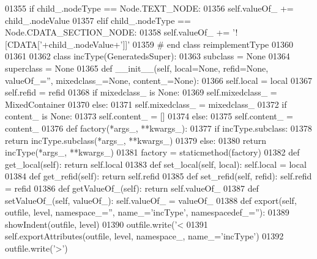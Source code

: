 \begin{DoxyCode}
{{{{{{{{{{{{{{{{{{{{{{{{{{{{{{{{{{{{{{{{{{{{{{{{{{{{{{{{{{{{{{{{{{{{{{{{{{{{{{{01355         \textcolor{keywordflow}{if} child\_.nodeType == Node.TEXT\_NODE:
01356             self.valueOf_ += child\_.nodeValue
01357         \textcolor{keywordflow}{elif} child\_.nodeType == Node.CDATA\_SECTION\_NODE:
01358             self.valueOf_ += \textcolor{stringliteral}{'![CDATA['}+child\_.nodeValue+\textcolor{stringliteral}{']]'}
01359 \textcolor{comment}{# end class reimplementType}
01360 
01361 
01362 \textcolor{keyword}{class }incType(GeneratedsSuper):
01363     subclass = \textcolor{keywordtype}{None}
01364     superclass = \textcolor{keywordtype}{None}
01365     \textcolor{keyword}{def }__init__(self, local=None, refid=None, valueOf\_='', mixedclass\_=None, content\_=None):
01366         self.local = local
01367         self.refid = refid
01368         \textcolor{keywordflow}{if} mixedclass\_ \textcolor{keywordflow}{is} \textcolor{keywordtype}{None}:
01369             self.mixedclass_ = MixedContainer
01370         \textcolor{keywordflow}{else}:
01371             self.mixedclass_ = mixedclass\_
01372         \textcolor{keywordflow}{if} content\_ \textcolor{keywordflow}{is} \textcolor{keywordtype}{None}:
01373             self.content_ = []
01374         \textcolor{keywordflow}{else}:
01375             self.content_ = content\_
01376     \textcolor{keyword}{def }factory(*args\_, **kwargs\_):
01377         \textcolor{keywordflow}{if} incType.subclass:
01378             \textcolor{keywordflow}{return} incType.subclass(*args\_, **kwargs\_)
01379         \textcolor{keywordflow}{else}:
01380             \textcolor{keywordflow}{return} incType(*args\_, **kwargs\_)
01381     factory = staticmethod(factory)
01382     \textcolor{keyword}{def }get_local(self): \textcolor{keywordflow}{return} self.local
01383     \textcolor{keyword}{def }set_local(self, local): self.local = local
01384     \textcolor{keyword}{def }get_refid(self): \textcolor{keywordflow}{return} self.refid
01385     \textcolor{keyword}{def }set_refid(self, refid): self.refid = refid
01386     \textcolor{keyword}{def }getValueOf_(self): \textcolor{keywordflow}{return} self.valueOf\_
01387     \textcolor{keyword}{def }setValueOf_(self, valueOf\_): self.valueOf\_ = valueOf\_
01388     \textcolor{keyword}{def }export(self, outfile, level, namespace\_='', name\_='incType', namespacedef\_=''):
01389         showIndent(outfile, level)
01390         outfile.write(\textcolor{stringliteral}{'<%
01391         self.exportAttributes(outfile, level, namespace\_, name\_=\textcolor{stringliteral}{'incType'})
01392         outfile.write(\textcolor{stringliteral}{'>'})
}}}}}}}}}}}}}}}}}}}}}}}}}}}}}}}}}}}}}}}}}}}}}}}}}}}}}}}}}}}}}}}}}}}}}}}}}}}}}}}}
\end{DoxyCode}
